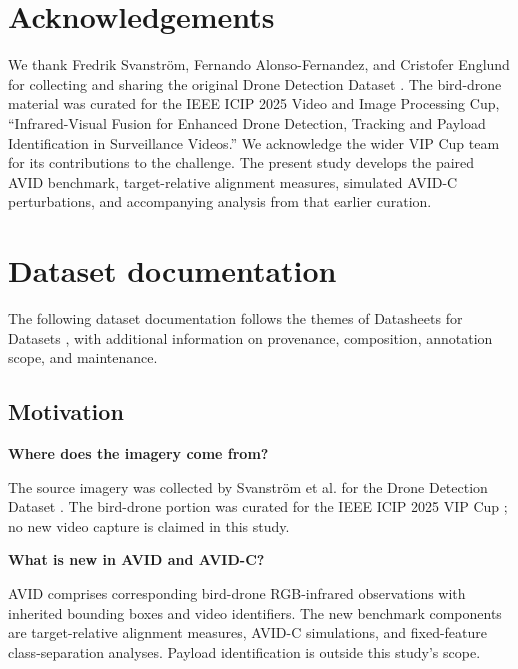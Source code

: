 \documentclass[10pt]{article}
\newcommand{\dataset}{\textsc{AVID}}
\newcommand{\corrupt}{\textsc{AVID-C}}
\begin{document}
\section*{Acknowledgements}

We thank Fredrik Svanstr\"om, Fernando Alonso-Fernandez, and Cristofer Englund for collecting and sharing the original Drone Detection Dataset \citep{svanstrom2021multisensor}. The bird-drone material was curated for the IEEE ICIP 2025 Video and Image Processing Cup, ``Infrared-Visual Fusion for Enhanced Drone Detection, Tracking and Payload Identification in Surveillance Videos.'' We acknowledge the wider VIP Cup team for its contributions to the challenge. The present study develops the paired \dataset{} benchmark, target-relative alignment measures, simulated \corrupt{} perturbations, and accompanying analysis from that earlier curation.




\clearpage
\appendix


\section{Dataset documentation}
\label{app:datasheet}

The following dataset documentation follows the themes of Datasheets for Datasets \citep{gebru2021datasheets}, with additional information on provenance, composition, annotation scope, and maintenance.

\subsection{Motivation}

\textbf{Where does the imagery come from?}

The source imagery was collected by Svanstr\"om et al. for the Drone Detection Dataset \citep{svanstrom2021multisensor}. The bird-drone portion was curated for the IEEE ICIP 2025 VIP Cup \citep{ieeevipcup2025}; no new video capture is claimed in this study.

\textbf{What is new in \dataset{} and \corrupt{}?}

\dataset{} comprises corresponding bird-drone RGB-infrared observations with inherited bounding boxes and video identifiers. The new benchmark components are target-relative alignment measures, \corrupt{} simulations, and fixed-feature class-separation analyses. Payload identification is outside this study's scope.
\end{document}
